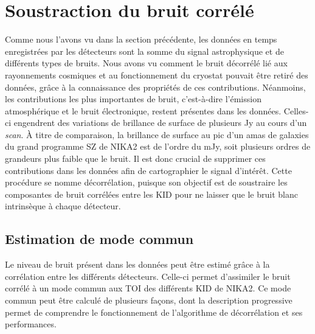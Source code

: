 \section{Soustraction du bruit corrélé} \label{sec:decor}

Comme nous l'avons vu dans la section précédente, les données en temps enregistrées par les détecteurs sont la somme du signal astrophysique et de différents types de bruits.
Nous avons vu comment le bruit décorrélé lié aux rayonnements cosmiques et au fonctionnement du cryostat pouvait être retiré des données, grâce à la connaissance des propriétés de ces contributions.
Néanmoins, les contributions les plus importantes de bruit, c'est-à-dire l'émission atmosphérique et le bruit électronique, restent présentes dans les données.
Celles-ci engendrent des variations de brillance de surface de plusieurs Jy au cours d'un \textit{scan}.
À titre de comparaison, la brillance de surface au pic d'un amas de galaxies du grand programme SZ de NIKA2 est de l'ordre du mJy, soit plusieurs ordres de grandeurs plus faible que le bruit.
Il est donc crucial de supprimer ces contributions dans les données afin de cartographier le signal d'intérêt.
Cette procédure se nomme décorrélation, puisque son objectif est de soustraire les composantes de bruit corrélées entre les KID pour ne laisser que le bruit blanc intrinsèque à chaque détecteur.

\subsection{Estimation de mode commun}\label{sec:common_mode}

Le niveau de bruit présent dans les données peut être estimé grâce à la corrélation entre les différents détecteurs.
Celle-ci permet d'assimiler le bruit corrélé à un mode commun aux TOI des différents KID de NIKA2.
Ce mode commun peut être calculé de plusieurs façons, dont la description progressive permet de comprendre le fonctionnement de l'algorithme de décorrélation et ses performances.

